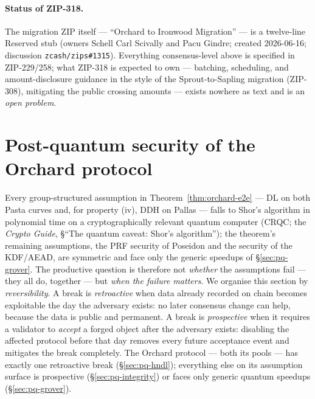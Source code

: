 \documentclass[11pt,a4paper]{article}
\theoremstyle{definition}
\begin{document}
\paragraph{Status of ZIP-318.} The migration ZIP itself --- ``Orchard to
Ironwood Migration'' --- is a twelve-line Reserved stub (owners Schell Carl
Scivally and Pacu Gindre; created 2026-06-16; discussion
\texttt{zcash/zips\#1315}). Everything consensus-level above is specified
in ZIP-229/258; what ZIP-318 is expected to own --- batching, scheduling,
and amount-disclosure guidance in the style of the Sprout-to-Sapling
migration (ZIP-308), mitigating the public crossing amounts --- exists
nowhere as text and is an \emph{open problem}.
\section{Post-quantum security of the Orchard protocol}\label{sec:pq-orchard}

Every group-structured assumption in Theorem~\ref{thm:orchard-e2e} --- DL on
both Pasta curves and, for property (iv), DDH on Pallas --- falls to Shor's
algorithm in polynomial time on a cryptographically relevant quantum computer
(CRQC; the \emph{Crypto Guide}, \S``The quantum caveat: Shor's algorithm'');
the theorem's remaining assumptions, the PRF security of Poseidon and the
security of the KDF/AEAD, are symmetric and face only the generic speedups of
\S\ref{sec:pq-grover}. The productive question is therefore not \emph{whether} the
assumptions fail --- they all do, together --- but \emph{when the failure
matters}. We organise this section by \emph{reversibility}. A break is
\emph{retroactive} when data already recorded on chain becomes exploitable the
day the adversary exists: no later consensus change can help, because the data
is public and permanent. A break is \emph{prospective} when it requires a
validator to \emph{accept} a forged object after the adversary exists:
disabling the affected protocol before that day removes every future
acceptance event and mitigates the break completely. The Orchard protocol
--- both its pools --- has
exactly one retroactive break (\S\ref{sec:pq-hndl}); everything else on its
assumption surface is prospective (\S\ref{sec:pq-integrity}) or faces only
generic quantum speedups (\S\ref{sec:pq-grover}).
\end{document}
